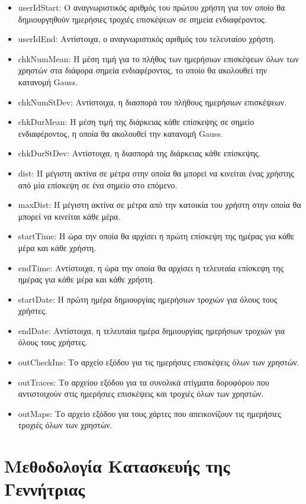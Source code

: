 \begin{itemize}
 \item userIdStart: Ο αναγνωριστικός αριθμός του πρώτου χρήστη για τον οποίο θα δημιουργηθούν ημερήσιες τροχιές επισκέψεων σε σημεία ενδιαφέροντος.
 \item userIdEnd: Αντίστοιχα, ο αναγνωριστικός αριθμός του τελευταίου χρήστη.
 \item chkNumMean: Η μέση τιμή για το πλήθος των ημερήσιων επισκέψεων όλων των χρηστών στα διάφορα σημεία ενδιαφέροντος, το οποίο θα ακολουθεί την κατανομή Gauss.
 \item chkNumStDev: Αντίστοιχα, η διασπορά του πλήθους ημερήσιων επισκέψεων.
 \item chkDurMean: Η μέση τιμή της διάρκειας κάθε επίσκεψης σε σημείο ενδιαφέροντος, η οποία θα ακολουθεί την κατανομή Gauss.
 \item chkDurStDev: Αντίστοιχα, η διασπορά της διάρκειας κάθε επίσκεψης.
 \item dist: Η μέγιστη ακτίνα σε μέτρα στην οποία θα μπορεί να κινείται ένας χρήστης από μία επίσκεψη σε ένα σημείο στο επόμενο.
 \item maxDist: Η μέγιστη ακτίνα σε μέτρα από την κατοικία του χρήστη στην οποία θα μπορεί να κινείται κάθε μέρα.
 \item startTime: Η ώρα την οποία θα αρχίσει η πρώτη επίσκεψη της ημέρας για κάθε μέρα και κάθε χρήστη.
 \item endTime: Αντίστοιχα, η ώρα την οποία θα αρχίσει η τελευταία επίσκεψη της ημέρας για κάθε μέρα και κάθε χρήστη.
 \item startDate: Η πρώτη ημέρα δημιουργίας ημερήσιων τροχιών για όλους τους χρήστες.
 \item endDate: Αντίστοιχα, η τελευταία ημέρα δημιουργίας ημερήσιων τροχιών για όλους τους χρήστες.
 \item outCheckIns: Το αρχείο εξόδου για τις ημερήσιες επισκέψεις όλων των χρηστών.
 \item outTraces: Το αρχείου εξόδου για τα συνολικά στίγματα δορυφόρου που αντιστοιχούν στις ημερήσιες επισκέψεις και τροχιές όλων των χρηστών.
 \item outMaps: Το αρχείο εξόδου για τους χάρτες που απεικονίζουν τις ημερήσιες τροχιές όλων των χρηστών. 
\end{itemize}

\section{Μεθοδολογία Κατασκευής της Γεννήτριας}

